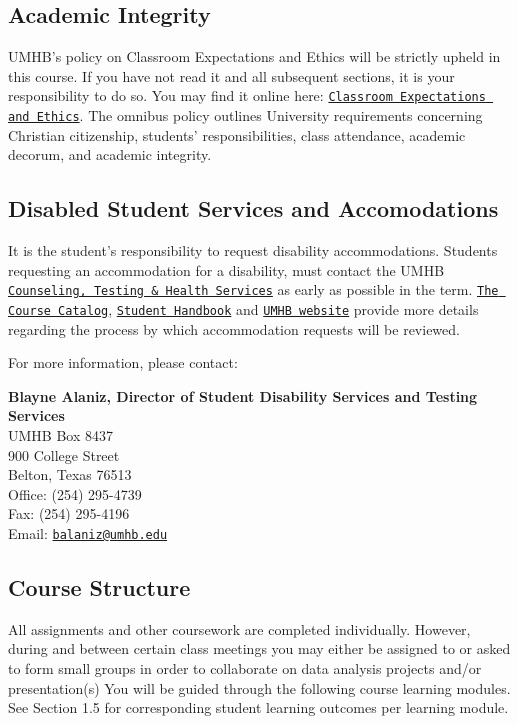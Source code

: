 \documentclass[
]{article}
\begin{document}
\subsection{Academic Integrity}

UMHB's policy on Classroom Expectations and Ethics will be strictly
upheld in this course. If you have not read it and all subsequent
sections, it is your responsibility to do so. You may find it online
here:
\href{http://catalog.umhb.edu/2020-2021/Graduate-Catalog/Classroom-Expectations-and-Ethics}{\texttt{Classroom Expectations and Ethics}}.
The omnibus policy outlines University requirements concerning Christian
citizenship, students' responsibilities, class attendance, academic
decorum, and academic integrity.

\subsection{Disabled Student Services and Accomodations}

It is the student's responsibility to request disability accommodations.
Students requesting an accommodation for a disability, must contact the
UMHB
\href{http://cths.umhb.edu/disability}{\texttt{Counseling, Testing \& Health Services}}
as early as possible in the term.
\href{http://catalog.umhb.edu/en/2019-2020/Graduate-Catalog}{\texttt{The Course Catalog}},
\href{http://students.umhb.edu/student-handbook}{\texttt{Student Handbook}}
and \href{https://go.umhb.edu/}{\texttt{UMHB website}} provide more
details regarding the process by which accommodation requests will be
reviewed.

For more information, please contact:

\textbf{Blayne Alaniz, Director of Student Disability Services and
Testing Services}\\
UMHB Box 8437\\
900 College Street\\
Belton, Texas 76513\\
Office: (254) 295-4739\\
Fax: (254) 295-4196\\
Email: \texttt{\href{mailto:balaniz@umhb.edu}{balaniz@umhb.edu}}

\subsection{Course Structure}

All assignments and other coursework are completed individually.
However, during and between certain class meetings you may either be
assigned to or asked to form small groups in order to collaborate on
data analysis projects and/or presentation(s) You will be guided through
the following course learning modules. See Section 1.5 for corresponding
student learning outcomes per learning module.
\end{document}
